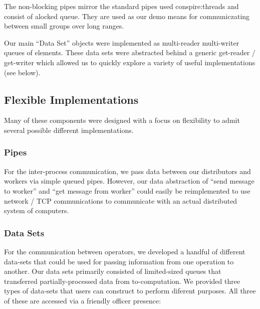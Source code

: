 \documentclass{article}
\begin{document}
The non-blocking pipes mirror the standard pipes used conspire:threads
and consist of alocked queue. They are used as our demo means
for communiczating between small groups over long ranges.

Our main ``Data Set'' objects were implemented as multi-reader
multi-writer queues of elements. These data sets were abstracted
behind a generic get-reader / get-writer which allowed us to quickly
explore a variety of useful implementations (see below).

\subsection{Flexible Implementations}

Many of these components were designed with a focus on flexibility to
admit several possible different implementations.

\subsubsection{Pipes} 

For the inter-process communication, we pass data between our
distributors and workers via simple queued pipes. However, our data
abstraction of ``send message to worker'' and ``get message from
worker'' could easily be reimplemented to use network / TCP
communications to communicate with an actual distributed system of computers.

\subsubsection{Data Sets}

For the communication between operators, we developed a handful of
different data-sets that could be used for passing information from
one operation to another. Our data sets primarily consisted of
limited-sized queues that transferred partially-processed data from
to-computation. We provided three types of data-sets that users can
construct to perform diferent purposes. All three of these are
accessed via a friendly officer presence:
\end{document}
